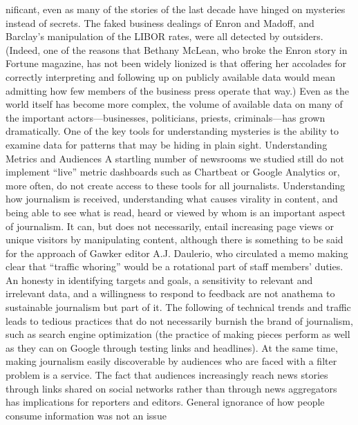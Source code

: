 nificant, even as many of the stories of the last decade have hinged on mysteries
instead of secrets. The faked business dealings of Enron and Madoff, and Barclay’s
manipulation of the LIBOR rates, were all detected by outsiders. (Indeed, one
of the reasons that Bethany McLean, who broke the Enron story in Fortune
magazine, has not been widely lionized is that offering her accolades for correctly
interpreting and following up on publicly available data would mean admitting
how few members of the business press operate that way.)
Even as the world itself has become more complex, the volume of available data
on many of the important actors—businesses, politicians, priests, criminals—has
grown dramatically. One of the key tools for understanding mysteries is the ability
to examine data for patterns that may be hiding in plain sight.
Understanding Metrics and Audiences
A startling number of newsrooms we studied still do not implement ``live'' metric
dashboards such as Chartbeat or Google Analytics or, more often, do not create
access to these tools for all journalists. Understanding how journalism is received,
understanding what causes virality in content, and being able to see what is read,
heard or viewed by whom is an important aspect of journalism. It can, but does
not necessarily, entail increasing page views or unique visitors by manipulating
content, although there is something to be said for the approach of Gawker editor
A.J. Daulerio, who circulated a memo making clear that ``traffic whoring''
would be a rotational part of staff members’ duties. An honesty in identifying
targets and goals, a sensitivity to relevant and irrelevant data, and a willingness
to respond to feedback are not anathema to sustainable journalism but part of it.
The following of technical trends and traffic leads to tedious practices that do
not necessarily burnish the brand of journalism, such as search engine optimization
(the practice of making pieces perform as well as they can on Google
through testing links and headlines). At the same time, making journalism easily
discoverable by audiences who are faced with a filter problem is a service. The
fact that audiences increasingly reach news stories through links shared on social
networks rather than through news aggregators has implications for reporters and
editors. General ignorance of how people consume information was not an issue

